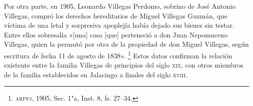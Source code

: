 \documentclass[14pt,twoside,final]{extbook} %
\let\oldfootnote\footnote
\renewcommand\footnote[1]{%
\oldfootnote{\hspace{1mm}#1}}
\begin{document}
Por otra parte, en 1905, Leonardo Villegas Perdomo, sobrino de José Antonio Villegas, compró los derechos hereditarios de Miguel Villegas Guzmán, que víctima de una letal y sorpresiva apoplejía había dejado sus bienes sin testar. Entre ellos sobresalía «[una] casa [que] perteneció a don Juan Nepomuceno Villegas, quien la permutó por otra de la propiedad de don Miguel Villegas, según escritura de fecha 11 de agosto de 1838».\footnote{\textsc{arppj}, 1905, Sec. 1"a, Inst. 8, fs. 27--34.} Estos datos confirman la relación existente entre la familia Villegas de principios del siglo \textsc{xix}, con otros miembros de la familia establecidos en Jalacingo a finales del siglo \textsc{xviii}.\protect\enlargethispage*{\baselineskip}
\end{document}
